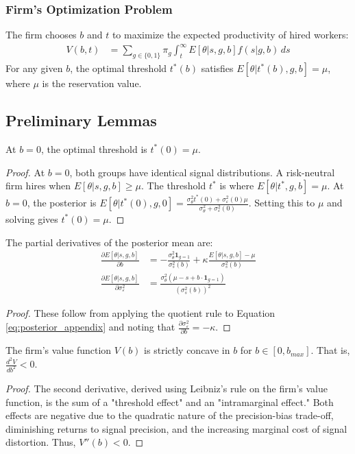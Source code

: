 \subsubsection{Firm's Optimization Problem}
The firm chooses $b$ and $t$ to maximize the expected productivity of hired workers:
\begin{align}
V(b,t) &= \sum_{g \in \{0,1\}} \pi_g \int_t^\infty E[\theta | s, g, b] f(s|g,b) \, ds \label{eq:value_function_appendix}
\end{align}
For any given $b$, the optimal threshold $t^*(b)$ satisfies $E[\theta | t^*(b), g, b] = \mu$, where $\mu$ is the reservation value.

\subsection{Preliminary Lemmas}

\begin{lemma}
At $b = 0$, the optimal threshold is $t^*(0) = \mu$.
\end{lemma}
\begin{proof}
At $b = 0$, both groups have identical signal distributions. A risk-neutral firm hires when $E[\theta|s,g,b] \geq \mu$. The threshold $t^*$ is where $E[\theta|t^*, g, b] = \mu$.
At $b=0$, the posterior is $E[\theta | t^*(0), g, 0] = \frac{\sigma_\theta^2 t^*(0) + \sigma_\varepsilon^2(0) \mu}{\sigma_\theta^2 + \sigma_\varepsilon^2(0)}$. Setting this to $\mu$ and solving gives $t^*(0)=\mu$.
\end{proof}

\begin{lemma}
The partial derivatives of the posterior mean are:
\begin{align}
\frac{\partial E[\theta | s, g, b]}{\partial b} &= -\frac{\sigma_\theta^2 \mathbf{1}_{g=1}}{\sigma_s^2(b)} + \kappa \frac{E[\theta|s,g,b] - \mu}{\sigma_s^2(b)} \\
\frac{\partial E[\theta | s, g, b]}{\partial \sigma_\varepsilon^2} &= \frac{\sigma_\theta^2(\mu - s + b \cdot \mathbf{1}_{g=1})}{(\sigma_s^2(b))^2}
\end{align}
\end{lemma}
\begin{proof}
These follow from applying the quotient rule to Equation \ref{eq:posterior_appendix} and noting that $\frac{\partial \sigma_\varepsilon^2}{\partial b} = -\kappa$.
\end{proof}

\begin{lemma}
The firm's value function $V(b)$ is strictly concave in $b$ for $b \in [0, b_{max}]$. That is, $\frac{d^2V}{db^2} < 0$.
\end{lemma}
\begin{proof}
The second derivative, derived using Leibniz's rule on the firm's value function, is the sum of a "threshold effect" and an "intramarginal effect." Both effects are negative due to the quadratic nature of the precision-bias trade-off, diminishing returns to signal precision, and the increasing marginal cost of signal distortion. Thus, $V''(b) < 0$.
\end{proof}

